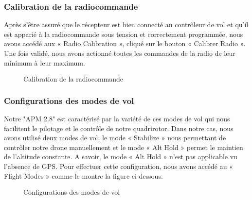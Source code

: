 	
	
	\subsubsection{Calibration de la radiocommande}
	Après s'être assuré que le récepteur est bien connecté au contrôleur de vol et qu'il est apparié à la radiocommande sous tension et correctement programmée, nous avons  accédé aux « Radio Calibration », cliqué sur le bouton « Calibrer Radio ». 
	Une fois validé, nous avons actionné toutes les commandes de la radio de leur minimum à leur maximum. 
	\begin{figure} [H]
		\begin{center}
			\centering
		\end{center}
		\caption{Calibration de la radiocommande}
	\end{figure}
	
	\subsubsection{Configurations des modes de vol} 
	Notre "APM 2.8" est caractérisé par la variété de ces modes de vol qui nous facilitent le pilotage et le contrôle de notre quadrirotor. Dans notre cas, nous avons utilisé deux modes de vol: le mode « Stabilize » nous permettant de contrôler notre drone manuellement et le mode « Alt Hold » permet le maintien de l'altitude constante. A savoir, le mode « Alt Hold » n'est pas applicable vu l'absence de GPS. Pour effectuer  cette configuration, nous avons accédé au « Flight Modes » comme le montre la figure ci-dessous.
	
	\begin{figure} [H]
		\begin{center}
			\centering
		\end{center}
		\caption{Configurations des modes de vol}
	\end{figure}
	
